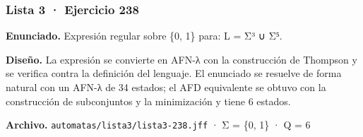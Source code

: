 
\hypertarget{lista-3-ejercicio-238}{%
\subsubsection{Lista 3 · Ejercicio 238}\label{lista-3-ejercicio-238}}

\textbf{Enunciado.} Expresión regular sobre \{0, 1\} para: L = Σ³ ∪ Σ⁵.

\textbf{Diseño.} La expresión se convierte en AFN-λ con la construcción de Thompson y se verifica contra la definición del lenguaje. El enunciado se resuelve de forma natural con un AFN-λ de 34 estados; el AFD equivalente se obtuvo con la construcción de subconjuntos y la minimización y tiene 6 estados.

\textbf{Archivo.} \texttt{automatas/lista3/lista3-238.jff} · Σ = \{0, 1\} · \textbar Q\textbar{} = 6

